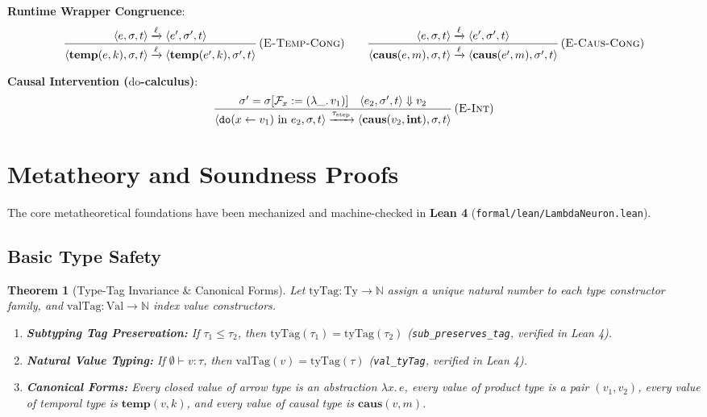 \documentclass[11pt,a4paper]{article}
\theoremstyle{definition}
\theoremstyle{plain}
\newtheorem{theorem}{Theorem}[section]
\newcommand{\ty}[1]{\texttt{#1}}
\newcommand{\step}[1]{\xrightarrow{#1}}
\newcommand{\evals}{\Downarrow}
\newcommand{\sub}{\le}
\begin{document}
\textbf{Runtime Wrapper Congruence}:
\begin{equation}
\frac{\langle e, \sigma, t \rangle \step{\ell} \langle e', \sigma', t \rangle}{\langle \mathbf{temp}(e, k), \sigma, t \rangle \step{\ell} \langle \mathbf{temp}(e', k), \sigma', t \rangle} \, (\textsc{E-Temp-Cong}) \qquad
\frac{\langle e, \sigma, t \rangle \step{\ell} \langle e', \sigma', t \rangle}{\langle \mathbf{caus}(e, m), \sigma, t \rangle \step{\ell} \langle \mathbf{caus}(e', m), \sigma', t \rangle} \, (\textsc{E-Caus-Cong})
\end{equation}

\textbf{Causal Intervention ($\text{do}$-calculus)}:
\begin{equation}
\frac{\sigma' = \sigma[\mathcal{F}_x := (\lambda\_.\, v_1)] \quad \langle e_2, \sigma', t \rangle \evals v_2}{\langle \ty{do}(x \gets v_1) \text{ in } e_2, \sigma, t \rangle \step{\tau_{\text{step}}} \langle \mathbf{caus}(v_2, \mathbf{int}), \sigma, t \rangle} \, (\textsc{E-Int})
\end{equation}

\section{Metatheory and Soundness Proofs}

The core metatheoretical foundations have been mechanized and machine-checked in \textbf{Lean 4} (\texttt{formal/lean/LambdaNeuron.lean}).

\subsection{Basic Type Safety}

\begin{theorem}[Type-Tag Invariance \& Canonical Forms]
\label{lem:canonical}
Let $\text{tyTag} : \text{Ty} \to \mathbb{N}$ assign a unique natural number to each type constructor family, and $\text{valTag} : \text{Val} \to \mathbb{N}$ index value constructors.
\begin{enumerate}[itemsep=1pt]
  \item \textbf{Subtyping Tag Preservation:} If $\tau_1 \sub \tau_2$, then $\text{tyTag}(\tau_1) = \text{tyTag}(\tau_2)$ (\texttt{sub\_preserves\_tag}, verified in Lean 4).
  \item \textbf{Natural Value Typing:} If $\emptyset \vdash v : \tau$, then $\text{valTag}(v) = \text{tyTag}(\tau)$ (\texttt{val\_tyTag}, verified in Lean 4).
  \item \textbf{Canonical Forms:} Every closed value of arrow type is an abstraction $\lambda x.\, e$, every value of product type is a pair $(v_1, v_2)$, every value of temporal type is $\mathbf{temp}(v, k)$, and every value of causal type is $\mathbf{caus}(v, m)$.
\end{enumerate}
\end{theorem}
\end{document}
